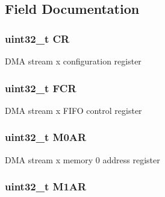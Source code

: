 \subsection{Field Documentation}
\hypertarget{struct_d_m_a___stream___type_def_ab40c89c59391aaa9d9a8ec011dd0907a}{
\subsubsection[{C\-R}]{ uint32\-\_\-t C\-R}}\label{struct_d_m_a___stream___type_def_ab40c89c59391aaa9d9a8ec011dd0907a}
D\-M\-A stream x configuration register \hypertarget{struct_d_m_a___stream___type_def_a5d5cc7f32884945503dd29f8f6cbb415}{
\subsubsection[{F\-C\-R}]{ uint32\-\_\-t F\-C\-R}}\label{struct_d_m_a___stream___type_def_a5d5cc7f32884945503dd29f8f6cbb415}
D\-M\-A stream x F\-I\-F\-O control register \hypertarget{struct_d_m_a___stream___type_def_a63b4d166f4ab5024db6b493a7ab7b640}{
\subsubsection[{M0\-A\-R}]{ uint32\-\_\-t M0\-A\-R}}\label{struct_d_m_a___stream___type_def_a63b4d166f4ab5024db6b493a7ab7b640}
D\-M\-A stream x memory 0 address register \hypertarget{struct_d_m_a___stream___type_def_aee7782244ceb4791d9a3891804ac47ac}{
\subsubsection[{M1\-A\-R}]{ uint32\-\_\-t M1\-A\-R}}\label{struct_d_m_a___stream___type_def_aee7782244ceb4791d9a3891804ac47ac}
